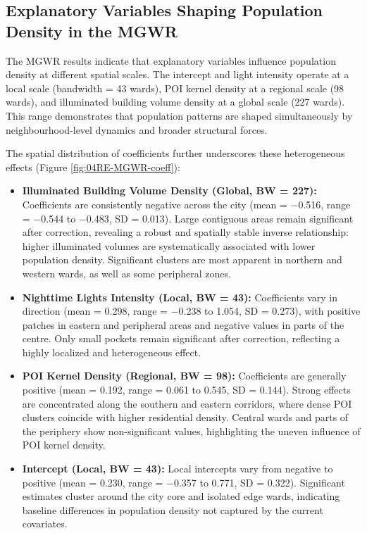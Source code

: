 \documentclass[
  12pt,
  oneside]{book}
\begin{document}
\subsection{Explanatory Variables Shaping Population Density in the MGWR}\label{explanatory-variables-shaping-population-density-in-the-mgwr}

The MGWR results indicate that explanatory variables influence population density at different spatial scales. The intercept and light intensity operate at a local scale (bandwidth = 43 wards), POI kernel density at a regional scale (98 wards), and illuminated building volume density at a global scale (227 wards). This range demonstrates that population patterns are shaped simultaneously by neighbourhood-level dynamics and broader structural forces.

The spatial distribution of coefficients further underscores these heterogeneous effects (Figure \ref{fig:04RE-MGWR-coeff}):

\begin{itemize}
\item
  \textbf{Illuminated Building Volume Density (Global, BW = 227):} Coefficients are consistently negative across the city (mean = −0.516, range = −0.544 to −0.483, SD = 0.013). Large contiguous areas remain significant after correction, revealing a robust and spatially stable inverse relationship: higher illuminated volumes are systematically associated with lower population density. Significant clusters are most apparent in northern and western wards, as well as some peripheral zones.
\item
  \textbf{Nighttime Lights Intensity (Local, BW = 43):} Coefficients vary in direction (mean = 0.298, range = −0.238 to 1.054, SD = 0.273), with positive patches in eastern and peripheral areas and negative values in parts of the centre. Only small pockets remain significant after correction, reflecting a highly localized and heterogeneous effect.
\item
  \textbf{POI Kernel Density (Regional, BW = 98):} Coefficients are generally positive (mean = 0.192, range = 0.061 to 0.545, SD = 0.144). Strong effects are concentrated along the southern and eastern corridors, where dense POI clusters coincide with higher residential density. Central wards and parts of the periphery show non-significant values, highlighting the uneven influence of POI kernel density.
\item
  \textbf{Intercept (Local, BW = 43):} Local intercepts vary from negative to positive (mean = 0.230, range = −0.357 to 0.771, SD = 0.322). Significant estimates cluster around the city core and isolated edge wards, indicating baseline differences in population density not captured by the current covariates.
\end{itemize}
\end{document}
